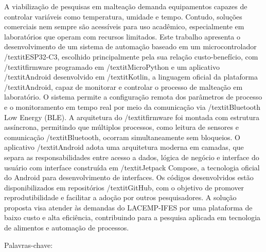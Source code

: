 \begin{resumo}
  \vspace{-15pt}
  
  A viabilização de pesquisas em malteação demanda equipamentos capazes de controlar variáveis como temperatura, umidade e tempo. Contudo, soluções comerciais nem sempre são acessíveis para uso acadêmico, especialmente em laboratórios que operam com recursos limitados. Este trabalho apresenta o desenvolvimento de um sistema de automação baseado em um microcontrolador /textit{ESP32-C3}, escolhido principalmente pela sua relação custo-benefício, com /textit{firmware} programado em /textit{MicroPython} e um aplicativo /textit{Android} desenvolvido em /textit{Kotlin}, a linguagem oficial da plataforma /textit{Android}, capaz de monitorar e controlar o processo de malteação em laboratório. O sistema permite a configuração remota dos parâmetros de processo e o monitoramento em tempo real por meio da comunicação via /textit{Bluetooth Low Energy} (BLE). A arquitetura do /textit{firmware} foi montada com estrutura assíncrona, permitindo que múltiplos processos, como leitura de sensores e comunicação /textit{Bluetooth}, ocorram simultaneamente sem bloqueios. O aplicativo /textit{Android} adota uma arquitetura moderna em camadas, que separa as responsabilidades entre acesso a dados, lógica de negócio e interface do usuário com interface construída em /textit{Jetpack Compose}, a tecnologia oficial do Android para desenvolvimento de interfaces. Os códigos desenvolvidos estão disponibilizados em repositórios /textit{GitHub}, com o objetivo de promover reprodutibilidade e facilitar a adoção por outros pesquisadores. A solução proposta visa atender às demandas do LACEMP-IFES por uma plataforma de baixo custo e alta eficiência, contribuindo para a pesquisa aplicada em tecnologia de alimentos e automação de processos.

  Palavras-chave: \palavraschaveemlinha
\end{resumo}


